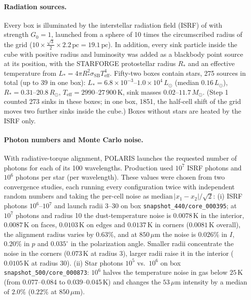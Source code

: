 \paragraph{Radiation sources.} Every box is illuminated by the interstellar radiation field (ISRF) of
\citet{Mathis1983} with strength $G_0=1$, launched from a sphere of 10 times the circumscribed radius of the grid
($10\times\tfrac{\sqrt3}{2}\times2.2\,\mathrm{pc}=19.1\,\mathrm{pc}$). In addition, every sink particle inside the
cube with positive radius and luminosity was added as a blackbody point source at its position, with the
STARFORGE protostellar radius $R_\ast$ and an effective temperature from
$L_\ast = 4\pi R_\ast^{2}\sigma_\mathrm{SB}T_\mathrm{eff}^{4}$. Fifty-two boxes contain stars, 275 sources in total
(up to 39 in one box): $L_\ast=6.8\times10^{-3}$--$1.0\times10^{4}\,L_\odot$ (median $0.16\,L_\odot$),
$R_\ast=0.31$--$20.8\,R_\odot$, $T_\mathrm{eff}=2990$--$27\,900\,\mathrm{K}$, sink masses
$0.02$--$11.7\,M_\odot$. (Step 1 counted 273 sinks in these boxes; in one box, 1851, the half-cell shift of the
grid moves two further sinks inside the cube.) Boxes without stars are heated by the ISRF only.

\paragraph{Photon numbers and Monte Carlo noise.} With radiative-torque alignment, POLARIS launches the
requested number of photons for each of its 100 wavelengths. Production used $10^{7}$ ISRF photons and $10^{6}$
photons per star (per wavelength). These values were chosen from two convergence studies, each running every
configuration twice with independent random numbers and taking the per-cell noise as
$\mathrm{median}\,|x_1-x_2|/\sqrt2$:
(i) ISRF photons $10^{6}$--$10^{7}$ and launch radii 3--30 on box \texttt{snapshot\_440/core\_000395}; at $10^{7}$
photons and radius 10 the dust-temperature noise is $0.0078\,\mathrm{K}$ in the interior, $0.0087\,\mathrm{K}$ on
faces, $0.0103\,\mathrm{K}$ on edges and $0.0137\,\mathrm{K}$ in corners ($0.0081\,\mathrm{K}$ overall), the
alignment radius varies by $0.63\%$, and at $850\,\mu\mathrm{m}$ the noise is $0.026\%$ in $I$, $0.20\%$ in $p$
and $0.035^\circ$ in the polarization angle. Smaller radii concentrate the noise in the corners
($0.073\,\mathrm{K}$ at radius 3), larger radii raise it in the interior ($0.0105\,\mathrm{K}$ at radius 30).
(ii) Star photons $10^{5}$ vs.\ $10^{6}$ on box \texttt{snapshot\_500/core\_000873}: $10^{6}$ halves the
temperature noise in gas below $25\,\mathrm{K}$ (from 0.077--0.084 to 0.039--0.045\,K) and changes the
$53\,\mu\mathrm{m}$ intensity by a median of $2.0\%$ ($0.22\%$ at $850\,\mu\mathrm{m}$).

